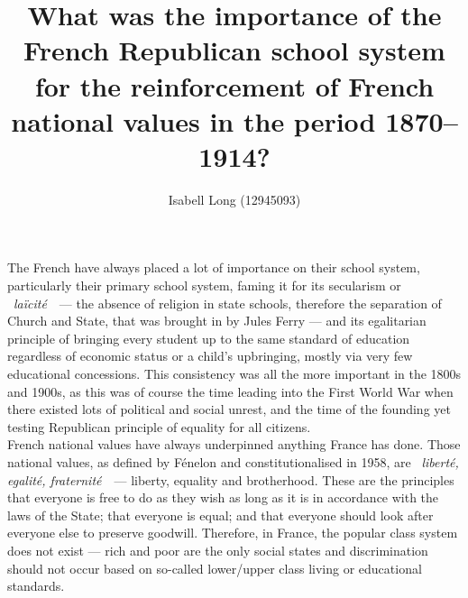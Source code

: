 \documentclass[12pt]{article}
\begin{document}
\title{What was the importance of the French Republican school system for the reinforcement of French national values in the period 1870--1914?}
\author{Isabell Long (12945093)}
\maketitle

The French have always placed a lot of importance on their school
system, particularly their primary school system, faming it for its
secularism or \guillemotleft~\textit{laïcité}~\guillemotright~--- the
absence of religion in state schools, therefore the separation of
Church and State, that was brought in by Jules Ferry --- and its
egalitarian principle of bringing every student up to the same
standard of education regardless of economic status or a child’s
upbringing, mostly via very few educational concessions. This
consistency was all the more important in the 1800s and 1900s, as this
was of course the time leading into the First World War when there
existed lots of political and social unrest, and the time of the
founding yet testing Republican principle of equality for all
citizens.\\

French national values have always underpinned anything France has
done. Those national values, as defined by Fénelon and
constitutionalised in 1958, are \guillemotleft~\textit{liberté,
egalité, fraternité}~\guillemotright~--- liberty, equality and
brotherhood\cite{national-values}. These are the principles that
everyone is free to do as they wish as long as it is in accordance
with the laws of the State; that everyone is equal; and that everyone
should look after everyone else to preserve goodwill. Therefore, in
France, the popular class system does not exist --- rich and poor are
the only social states and discrimination should not occur based on
so-called lower\slash upper class living or educational standards.\\
\end{document}
